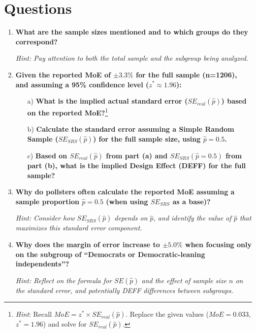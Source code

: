 \documentclass[12pt]{article}
\begin{document}
\section*{Questions}

\begin{enumerate}
    \item \textbf{What are the sample sizes mentioned and to which groups do they correspond?}

    \textit{Hint: Pay attention to both the total sample and the subgroup being analyzed.}

    \item \textbf{Given the reported MoE of $\pm 3.3\%$ for the full sample (n=1206), and assuming a 95\% confidence level ($z^* \approx 1.96$):}
    \begin{itemize}
        \item[a)] \textbf{What is the implied actual standard error ($SE_{real}(\hat{p})$) based on the reported MoE?}\footnote{\emph{Hint}: Recall $MoE = z^* \times SE_{real}(\hat{p})$. Replace the given values ($MoE=0.033$, $z^*=1.96$) and solve for $SE_{real}(\hat{p})$.}
        \item[b)] \textbf{Calculate the standard error assuming a Simple Random Sample ($SE_{SRS}(\hat{p})$) for the full sample size, using $\hat{p}=0.5$.}
        \item[c)] \textbf{Based on $SE_{real}(\hat{p})$ from part (a) and $SE_{SRS}(\hat{p}=0.5)$ from part (b), what is the implied Design Effect (DEFF) for the full sample?}
    \end{itemize}

    \item \textbf{Why do pollsters often calculate the reported MoE assuming a sample proportion $\hat{p} = 0.5$ (when using $SE_{SRS}$ as a base)?}

    \textit{Hint: Consider how $SE_{SRS}(\hat{p})$ depends on $\hat{p}$, and identify the value of $\hat{p}$ that maximizes this standard error component.}

    \item \textbf{Why does the margin of error increase to $\pm 5.0\%$ when focusing only on the subgroup of ``Democrats or Democratic-leaning independents''?}

    \textit{Hint: Reflect on the formula for $SE(\hat{p})$ and the effect of sample size $n$ on the standard error, and potentially DEFF differences between subgroups.}


\end{enumerate}
\end{document}
